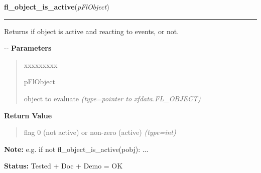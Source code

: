 \hspace{.8\funcindent}\begin{boxedminipage}{\funcwidth}

    \raggedright \textbf{fl\_object\_is\_active}(\textit{pFlObject})

    \vspace{-1.5ex}

    \rule{\textwidth}{0.5\fboxrule}
\setlength{\parskip}{2ex}

Returns if object is active and reacting to events, or not.

-{}-
\setlength{\parskip}{1ex}
      \textbf{Parameters}
      \vspace{-1ex}

      \begin{quote}
        \begin{Ventry}{xxxxxxxxx}

          \item[pFlObject]


object to evaluate
            {\it (type=pointer to xfdata.FL\_OBJECT)}

        \end{Ventry}

      \end{quote}

      \textbf{Return Value}
    \vspace{-1ex}

      \begin{quote}

flag 0 (not active) or non-zero (active)
      {\it (type=int)}

      \end{quote}

\textbf{Note:} 
e.g. if not fl\_object\_is\_active(pobj): ...


\textbf{Status:} 
Tested + Doc + Demo = OK


    \end{boxedminipage}

    \label{xformslib:flbasic:fl_enumerate_fonts}

    \vspace{0.5ex}

